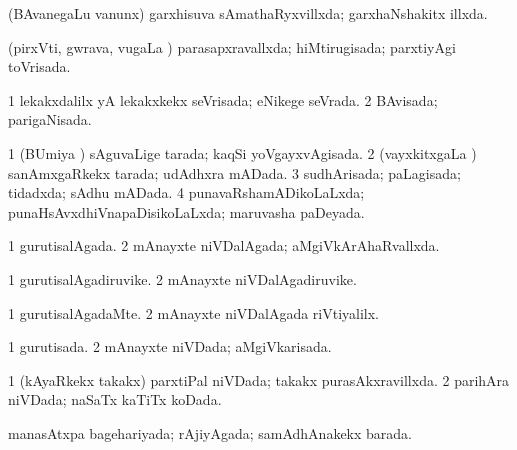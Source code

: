 {{\bentry
{} 
\gl{\gu}
\expl{}
\bmng
(BAvanegaLu \mo vanunx) garxhisuva sAmathaRyxvillxda; garxhaNshakitx illxda. 
\emng
\eentry

\bentry
{} 
\gl{\gu}
\expl{}
\bmng
(pirxVti, gwrava, \mo vugaLa \vi) parasapxravallxda; hiMtirugisada; parxtiyAgi toVrisada. 
\emng
\eentry

\bentry
{} 
\gl{\gu}
\expl{}
\bmng
\bnum
\num{1} lekakxdalilx yA lekakxkekx seVrisada; eNikege seVrada. 
\num{2} BAvisada; parigaNisada. 
\enum
\emng
\eentry

\bentry
{} 
\gl{\gu}
\expl{}
\bmng
\bnum
\num{1} (BUmiya \vi) sAguvaLige tarada; kaqSi yoVgayxvAgisada. 
\num{2} (vayxkitxgaLa \vi) sanAmxgaRkekx tarada; udAdhxra mADada. 
\num{3} sudhArisada; paLagisada; tidadxda; sAdhu mADada. 
\num{4} punavaRshamADikoLaLxda; punaHsAvxdhiVnapaDisikoLaLxda; maruvasha paDeyada. 
\enum
\emng
\eentry

\bentry
{} 
\gl{\gu}
\expl{}
\bmng
{} 
\emng
\eentry

\bentry 
{} 
\gl{\gu}
\expl{}
\bmng
\bnum
\num{1} gurutisalAgada. 
\num{2} mAnayxte niVDalAgada; aMgiVkArAhaRvallxda. 
\enum
\emng
\eentry

\bentry
{} 
\gl{\nA}
\expl{}
\bmng
\bnum
\num{1} gurutisalAgadiruvike. 
\num{2} mAnayxte niVDalAgadiruvike. 
\enum
\emng
\eentry

\bentry
{} 
\gl{\kirxvi}
\expl{}
\bmng
\bnum
\num{1} gurutisalAgadaMte. 
\num{2} mAnayxte niVDalAgada riVtiyalilx. 
\enum
\emng
\eentry

\bentry
{} 
\gl{\gu}
\expl{}
\bmng
\bnum
\num{1} gurutisada. 
\num{2} mAnayxte niVDada; aMgiVkarisada. 
\enum
\emng
\eentry

\bentry
{} 
\gl{\gu}
\expl{}
\bmng
\bnum
\num{1} (kAyaRkekx takakx) parxtiPal niVDada; takakx purasAkxravillxda. 
\num{2} parihAra niVDada; naSaTx kaTiTx koDada. 
\enum
\emng
\eentry

\bentry
{} 
\gl{\gu}
\expl{}
\bmng
manasAtxpa bagehariyada; rAjiyAgada; samAdhAnakekx barada. 
\emng
\eentry

}}
